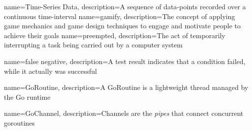  {
  name=Time-Series Data, description={A sequence of data-points recorded over a
  continuous time-interval}
}
 {
  name=gamify, description={The concept of applying game mechanics and game
  design techniques to engage and motivate people to achieve their goals}
}
 {
  name=preempted, description={The act of temporarily interrupting a task being
  carried out by a computer system}
}

 { name=false negative, description={A test
result indicates that a condition failed, while it actually was successful} }

 { name=GoRoutine, description={A GoRoutine is a
lightweight thread managed by the Go runtime} }

 { name=GoChannel, description={Channels are the \emph{pipes} that connect concurrent goroutines}}
